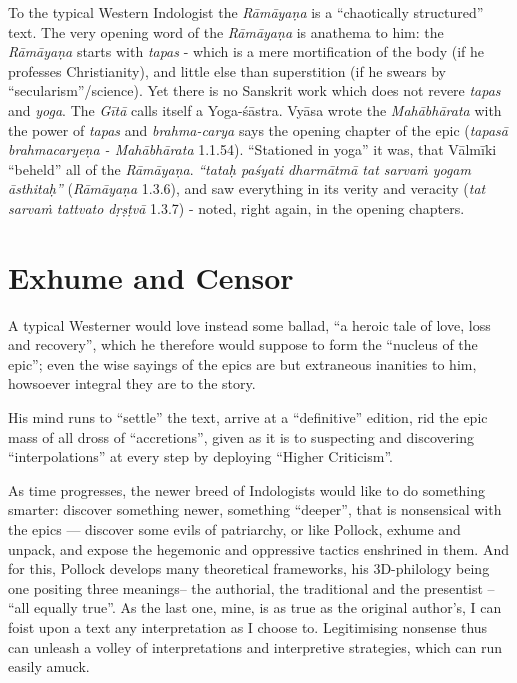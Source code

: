 To the typical Western Indologist the {\sl Rāmāyaṇa} is a ``chaotically structured'' text. The very opening word of the {\sl Rāmāyaṇa} is anathema to him: the {\sl Rāmāyaṇa} starts with {\sl tapas} -  which is a mere mortification of the body (if he professes Christianity), and little else than superstition (if he swears by ``secularism''/science). Yet there is no Sanskrit work which does not revere {\sl tapas} and {\sl yoga}. The {\sl Gītā} calls itself a Yoga-śāstra. Vyāsa wrote the {\sl Mahābhārata} with the power of {\sl tapas} and {\sl brahma-carya} says the opening chapter of the epic ({\sl tapasā brahmacaryeṇa  - Mahābhārata} 1.1.54). ``Stationed in yoga'' it was, that Vālmīki  ``beheld'' all of the {\sl Rāmāyaṇa}. {\sl ``tataḥ paśyati dharmātmā tat sarvaṁ yogam āsthitaḥ''} ({\sl Rāmāyaṇa} 1.3.6), and saw everything in its verity and veracity ({\sl tat sarvaṁ tattvato dṛṣṭvā} 1.3.7) - noted, right again, in the opening chapters.\\[-20pt]

\section*{Exhume and Censor}

A typical Westerner would love instead some ballad, ``a heroic tale of love, loss and recovery'', which he therefore would suppose to form the ``nucleus of the epic''; even the wise sayings of the epics are but extraneous inanities to him, howsoever integral they are to the story.

His mind runs to “settle” the text, arrive at a “definitive” edition, rid the epic mass of all dross of  “accretions”, given as it is to suspecting and discovering “interpolations” at every step by deploying “Higher Criticism”.

As time progresses, the newer breed of Indologists would like to do something smarter: discover something newer, something “deeper”, that is nonsensical with the epics --- discover some evils of patriarchy, or like Pollock, exhume and unpack, and expose the hegemonic and oppressive tactics enshrined in them. And for this, Pollock develops many theoretical frameworks, his 3D-philology being one positing three meanings-- the authorial, the traditional and the presentist -- “all equally true”. As the last one, mine, is as true as the original author's, I can foist upon a text any interpretation as I choose to. Legitimising nonsense thus can unleash a volley of interpretations and interpretive strategies, which can run easily amuck.

